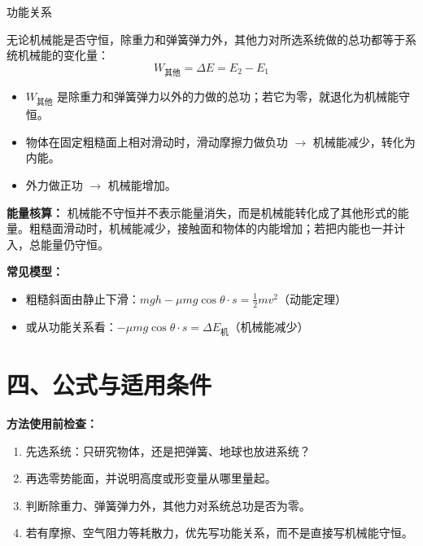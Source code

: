 \begin{conceptbox}{功能关系}

无论机械能是否守恒，除重力和弹簧弹力外，其他力对所选系统做的总功都等于系统机械能的变化量：
\[
\boxed{W_{\text{其他}} = \Delta E = E_2 - E_1}
\]

\begin{itemize}
  \item $W_{\text{其他}}$ 是除重力和弹簧弹力以外的力做的总功；若它为零，就退化为机械能守恒。
  \item 物体在固定粗糙面上相对滑动时，滑动摩擦力做负功 $\to$ 机械能减少，转化为内能。
  \item 外力做正功 $\to$ 机械能增加。

\end{itemize}

\textbf{能量核算：} 机械能不守恒并不表示能量消失，而是机械能转化成了其他形式的能量。粗糙面滑动时，机械能减少，接触面和物体的内能增加；若把内能也一并计入，总能量仍守恒。

\begin{center}


\label{fig:energy-account-bar}
\end{center}

\textbf{常见模型：}
\begin{itemize}
  \item 粗糙斜面由静止下滑：$mgh - \mu mg\cos\theta \cdot s = \frac12 mv^2$（动能定理）
  \item 或从功能关系看：$-\mu mg\cos\theta \cdot s = \Delta E_{\text{机}}$（机械能减少）
\end{itemize}

\end{conceptbox}

\section*{四、公式与适用条件}

\textbf{方法使用前检查：}
\begin{enumerate}
  \item 先选系统：只研究物体，还是把弹簧、地球也放进系统？
  \item 再选零势能面，并说明高度或形变量从哪里量起。
  \item 判断除重力、弹簧弹力外，其他力对系统总功是否为零。
  \item 若有摩擦、空气阻力等耗散力，优先写功能关系，而不是直接写机械能守恒。
\end{enumerate}

